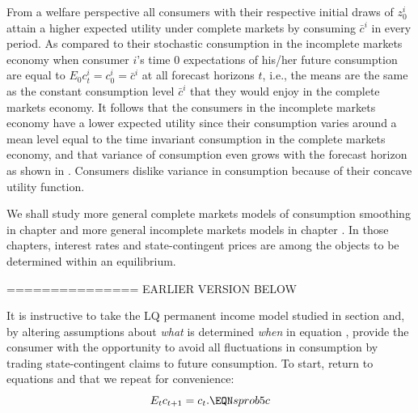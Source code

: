 From a welfare perspective all consumers with 
their respective initial draws of $z^i_0$ 
attain a higher expected utility under complete 
markets by consuming $\bar c^i$ in every period. 
As compared to their stochastic consumption
in the incomplete markets economy when  
consumer $i$'s time $0$ expectations of his/her
future consumption are equal to 
$E_0 c^i_t = c^i_0 = \bar c^i$ at all forecast
horizons $t$, i.e., the means are the same as 
the constant consumption level $\bar c^i$ that
they would enjoy in the complete markets
economy. It follows that the consumers in the 
incomplete markets economy have a lower
expected utility since their consumption varies
around a mean level equal to the time invariant
consumption in the complete markets economy,
and that variance of consumption even grows
with the forecast horizon as shown in
. Consumers dislike
variance in consumption because of their
concave utility function.

We shall study  more general complete markets models of consumption smoothing in chapter 
and more general incomplete markets models in chapter
.  In those chapters, interest rates and state-contingent prices are among
the objects to be  determined within an  equilibrium.




===============
\noindent EARLIER VERSION BELOW

It is instructive to take  the LQ permanent income model studied in section  and, by altering assumptions
about {\it what\/} is determined {\it when\/} in equation  ,  provide the consumer with  the opportunity
to avoid all fluctuations in consumption by trading state-contingent claims to future consumption.
To start,   return to   equations   and  that   we repeat for convenience:
$$ E_t c_{t+1} = c_t . \EQN sprob5c $$

